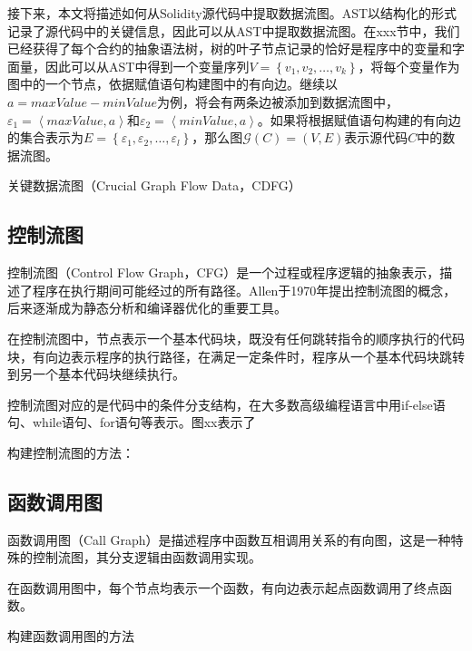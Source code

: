 接下来，本文将描述如何从Solidity源代码中提取数据流图。AST以结构化的形式记录了源代码中的关键信息，因此可以从AST中提取数据流图。在xxx节中，我们已经获得了每个合约的抽象语法树，树的叶子节点记录的恰好是程序中的变量和字面量，因此可以从AST中得到一个变量序列$V=\left\{v_1, v_2, \ldots, v_k\right\}$，将每个变量作为图中的一个节点，依据赋值语句构建图中的有向边。继续以$a=maxValue-minValue$为例，将会有两条边被添加到数据流图中，$\varepsilon_1=\left\langle maxValue, a\right\rangle$和$\varepsilon_2=\left\langle minValue, a\right\rangle$。如果将根据赋值语句构建的有向边的集合表示为$E=\left\{\varepsilon_1, \varepsilon_2, \ldots, \varepsilon_l\right\}$，那么图$\mathcal{G}(C)=(V, E)$表示源代码$C$中的数据流图。


关键数据流图（Crucial Graph Flow Data，CDFG）
\subsection{控制流图}

控制流图（Control Flow Graph，CFG）是一个过程或程序逻辑的抽象表示，描述了程序在执行期间可能经过的所有路径。Allen于1970年提出控制流图的概念\cite{allencfg}，后来逐渐成为静态分析和编译器优化的重要工具。

在控制流图中，节点表示一个基本代码块，既没有任何跳转指令的顺序执行的代码块，有向边表示程序的执行路径，在满足一定条件时，程序从一个基本代码块跳转到另一个基本代码块继续执行。

控制流图对应的是代码中的条件分支结构，在大多数高级编程语言中用if-else语句、while语句、for语句等表示。图xx表示了

构建控制流图的方法：
\subsection{函数调用图}
函数调用图（Call Graph）是描述程序中函数互相调用关系的有向图，这是一种特殊的控制流图，其分支逻辑由函数调用实现。

在函数调用图中，每个节点均表示一个函数，有向边表示起点函数调用了终点函数。

构建函数调用图的方法



